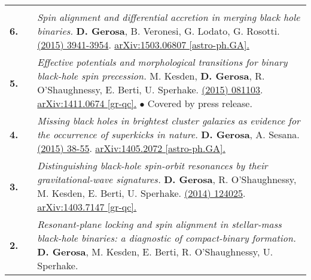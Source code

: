 {\begin{longtable}{rp{0.3cm}p{15.8cm}}
\vspace{0.09cm}\\
%
\textbf{6.} & & \textit{Spin alignment and differential accretion in merging black hole binaries.}
\newline{}
\textbf{D. Gerosa}, B. Veronesi, G. Lodato, G. Rosotti.
\newline{}
\href{http://dx.doi.org/10.1093/mnras/stv1214}{\mnras 451 (2015) 3941-3954}. \href{https://arxiv.org/abs/1503.06807}{arXiv:1503.06807 [astro-ph.GA].}
\vspace{0.09cm}\\
%
\textbf{5.} & & \textit{Effective potentials and morphological transitions for binary black-hole spin precession.}
\newline{}
M. Kesden, \textbf{D. Gerosa}, R. O'Shaughnessy, E. Berti, U. Sperhake.
\newline{}
\href{http://dx.doi.org/10.1103/PhysRevLett.114.081103}{\prl 114 (2015) 081103}. \href{https://arxiv.org/abs/1411.0674}{arXiv:1411.0674 [gr-qc].}
\newline{}
\textcolor{color1}{$\bullet$} Covered by press release.
\vspace{0.09cm}\\
%
\textbf{4.} & & \textit{Missing black holes in brightest cluster galaxies as evidence for the occurrence of superkicks in nature.}
\newline{}
\textbf{D. Gerosa}, A. Sesana.
\newline{}
\href{http://dx.doi.org/10.1093/mnras/stu2049}{\mnras 446 (2015) 38-55}. \href{https://arxiv.org/abs/1405.2072}{arXiv:1405.2072 [astro-ph.GA].}
\vspace{0.09cm}\\
%
\textbf{3.} & & \textit{Distinguishing black-hole spin-orbit resonances by their gravitational-wave signatures.}
\newline{}
\textbf{D. Gerosa}, R. O'Shaughnessy, M. Kesden, E. Berti, U. Sperhake.
\newline{}
\href{http://dx.doi.org/10.1103/PhysRevD.89.124025}{\prd 89 (2014) 124025}. \href{https://arxiv.org/abs/1403.7147}{arXiv:1403.7147 [gr-qc].}
\vspace{0.09cm}\\
%
\textbf{2.} & & \textit{Resonant-plane locking and spin alignment in stellar-mass black-hole binaries: a diagnostic of compact-binary formation.}
\newline{}
\textbf{D. Gerosa}, M. Kesden, E. Berti, R. O'Shaughnessy, U. Sperhake.
\newline{}

\end{longtable}}
